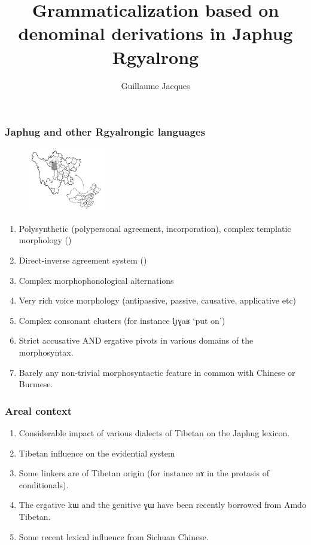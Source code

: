 \documentclass[xcolor=table]{beamer}
\newcommand{\ipa}[1]{{\phon \mbox{#1}}} %
\begin{document}
 \title{Grammaticalization based on denominal derivations in Japhug Rgyalrong}
 \author{Guillaume Jacques}
 \maketitle
 
  \begin{frame} 
 \frametitle{Japhug and other Rgyalrongic languages} 
 \begin{figure}[H]
\centering
\includegraphics[height=28mm]{carte.JPG}
\end{figure}
 
 
 \begin{enumerate}[<+->]
 \item Polysynthetic (polypersonal agreement, incorporation), complex templatic morphology (\citealt{jacques13harmonization})
  \item Direct-inverse agreement system (\citealt{jacques10inverse})
 \item Complex morphophonological alternations
 \item Very rich voice morphology (antipassive, passive, causative, applicative etc)
 \item Complex consonant clusters (for instance \ipa{lɟɣaʁ} `put on')
 \item Strict accusative AND ergative pivots in various domains of the morphosyntax.
 \item Barely any non-trivial morphosyntactic feature in common with Chinese or Burmese.
 \end{enumerate}
  
  \end{frame}   

  \begin{frame} 
 \frametitle{Areal context} 
 \begin{enumerate}[<+->]
 \item Considerable impact of various dialects of Tibetan on the Japhug lexicon.
 \item Tibetan influence on the evidential system
 \item Some linkers are of Tibetan origin (for instance \ipa{nɤ} in the protasis of conditionals).
 \item The ergative \ipa{kɯ} and the genitive \ipa{ɣɯ} have been recently borrowed from Amdo Tibetan.
 \item Some recent lexical influence from Sichuan Chinese.
 \end{enumerate}
  \end{frame}   
\end{document}
